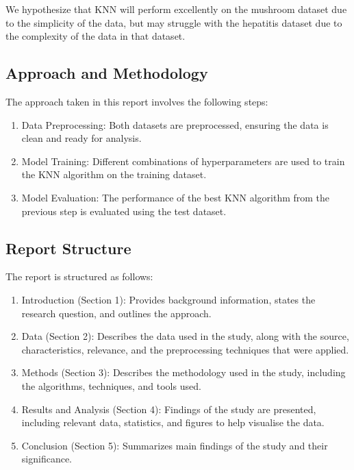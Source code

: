 We hypothesize that KNN will perform excellently on the mushroom dataset due to the simplicity of the data,
but may struggle with the hepatitis dataset due to the complexity of the data in that dataset.

\subsection{Approach and Methodology}
The approach taken in this report involves the following steps:
\begin{enumerate}
    \item Data Preprocessing: Both datasets are preprocessed, ensuring the data is clean and ready for analysis.
    \item Model Training: Different combinations of hyperparameters are used to train the KNN algorithm on the training dataset.
    \item Model Evaluation: The performance of the best KNN algorithm from the previous step is evaluated using the test dataset.
\end{enumerate}

\subsection{Report Structure}
The report is structured as follows:
\begin{enumerate}
    \item Introduction (Section 1): Provides background information, states the research question, and outlines the approach.
    \item Data (Section 2): Describes the data used in the study, along with the source, characteristics, relevance, and the preprocessing techniques that were applied.
    \item Methods (Section 3): Describes the methodology used in the study, including the algorithms, techniques, and tools used.
    \item Results and Analysis (Section 4): Findings of the study are presented, including relevant data, statistics, and figures to help visualise the data.
    \item Conclusion (Section 5): Summarizes main findings of the study and their significance.
\end{enumerate}